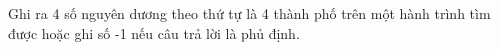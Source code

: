 Ghi ra 4 số nguyên dương theo thứ tự là 4 thành phố trên một hành trình tìm được hoặc ghi số -1 nếu câu trả lời là phủ định.

\